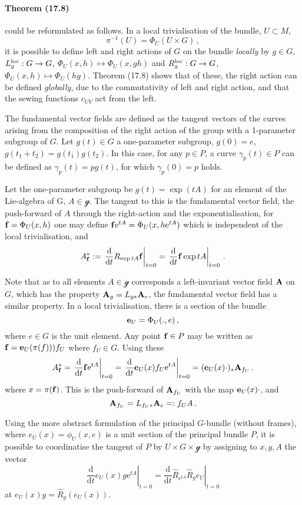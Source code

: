 \documentclass[a4paper,12pt]{article}
\def\d{\mathrm{d}}
\def\e{\mathrm{e}}
\begin{document}
\paragraph{Theorem (17.8)} could be reformulated as follows. In a local trivialisation of the bundle, $U\subset M$,
\[
 \pi^{-1}(U) = \Phi_U(U\times G)\,,
\]
it is possible to define left and right actions of $G$ on the bundle {\sl locally}\/ by $g\in G$, $L_g^{\rm loc}: G\to G$, $\Phi_U(x, h)\mapsto \Phi_U(x, gh)$ and
$R_g^{\rm loc}:G\to G$, $\Phi_U(x, h)\mapsto \Phi_U(hg)$. Theorem (17.8) shows that of these, the right action can be defined {\sl globally}, due to the commutativity of left and right action, and that the sewing functions $c_{UV}$ act from the left.

The fundamental vector fields are defined as the tangent vectors of the curves arising from the composition of the right action of the group with a 1-parameter subgroup of $G$. Let $g(t)\in G$ a one-parameter subgroup, $g(0)=e$, $g(t_1+t_2)=g(t_1)g(t_2)$. In this case, for any $p\in P$, a curve $\gamma_p(t)\in P$ can be defined as $\gamma_p(t) = p g(t)$, for which $\gamma_p(0) = p$ holds.

Let the one-parameter subgroup be $g(t) = \exp(tA)$ for an element of the Lie-algebra of G, $A\in \mathcal{g} $. The tangent to this is the fundamental vector field, the push-forward of $A$ through the right-action and the exponentialisation, for ${\bf f} =\Phi_U(x, h)$ one may define ${\bf f}\e^{tA} = \Phi_U(x, h\e^{tA})$ which is independent of the local trivialisation, and
\[
 A^*_{\bf f} := \left.\frac{\d}{\d t}R_{\exp tA} {\bf f}\right|_{t=0} = \left.\frac{\d}{\d t} {\bf f} \exp tA\right|_{t=0}\,.
\]

Note that as to all elements $A\in\mathcal{g}$ corresponds a left-invariant vector field ${\bf A}$ on $G$, which has the property ${\bf A}_g = L_{g*} {\bf A}_e$, the fundamental vector field has a similar property. In a local trivialisation, there is a section of the bundle
\[
 {\bf e}_U = \Phi_U(., e)\,,
\]
where $e\in G$ is the unit element. Any point ${\bf f}\in P$ may be written as ${\bf f} = {\bf e}_{U}(\pi(f))) f_U$ where $f_U \in G$. Using these
\[
 A^*_{\bf f} = \left.\frac{\d}{\d t} {\bf f}\e^{tA}\right|_{t=0} = \left.\frac{\d}{\d t}{\bf e}_U(x) f_U \e^{tA}\right|_{t=0} = ({\bf e}_U(x)\cdot)_* {\bf A}_{f_U}\,.
\]
where $x=\pi({\bf f})$. This is the push-forward of ${\bf A}_{f_U}$ with the map ${\bf e}_U(x)\cdot$, and
\[
 {\bf A}_{f_U} = L_{f_U*}{\bf A}_e =: f_U A\,.
\]

Using the more abstract formulation of the principal $G$-bundle (without frames), where $e_U(x) = \phi_U(x, e)$ is a unit section of the principal bundle $P$, it is possible to coordinatise the tangent of $P$ by $U\times G \times \mathcal{g}$ by assigning to $x, g, A$ the vector
\[
 \left.\frac{\d}{\d t} e_{U}(x) g \e^{tA}\right|_{t=0}= \left. \frac{\d}{\d t}\hat{R}_{\e^{tA}}\hat{R}_g e_U \right|_{t=0}
\]
at $e_U(x) g = \hat{R}_g(e_U(x))$.
\end{document}
